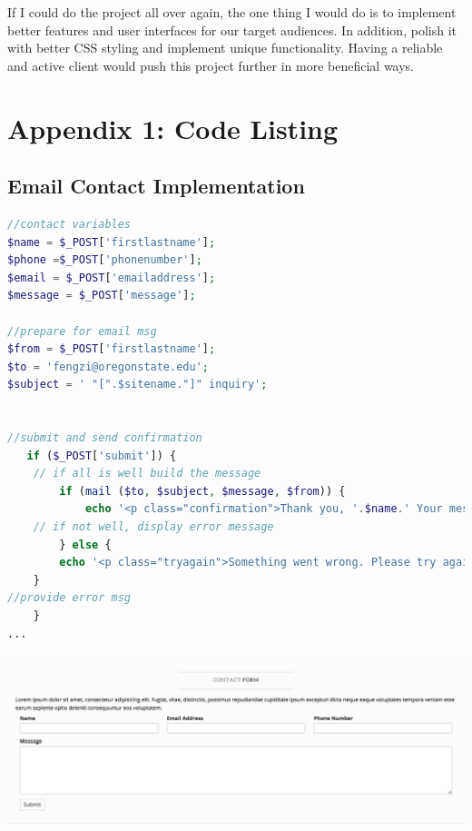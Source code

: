 \documentclass[onecolumn, draftclsnofoot,10pt, compsoc]{IEEEtran}
\begin{document}
\noindent If I could do the project all over again, the one thing I would do is to implement better features and user interfaces for our target audiences. In addition, polish it with better CSS styling and implement unique functionality. Having a reliable and active client would push this project further in  more beneficial ways. \\

\newpage
\section{Appendix 1: Code Listing}

\subsection{Email Contact Implementation}
\begin{lstlisting}[language=php]        //contact variables
$name = $_POST['firstlastname'];
$phone =$_POST['phonenumber'];
$email = $_POST['emailaddress'];
$message = $_POST['message'];

//prepare for email msg
$from = $_POST['firstlastname']; 
$to = 'fengzi@oregonstate.edu'; 
$subject = ' "[".$sitename."]" inquiry';


//submit and send confirmation 
   if ($_POST['submit']) {
    // if all is well build the message             
        if (mail ($to, $subject, $message, $from)) { 
            echo '<p class="confirmation">Thank you, '.$name.' Your message has been sent!</p>';
    // if not well, display error message
        } else { 
        echo '<p class="tryagain">Something went wrong. Please try again.</p>'; 
    }
//provide error msg
    }
...
\end{lstlisting}

\includegraphics[width=17cm, height=5cm]{email.png}
\end{document}
